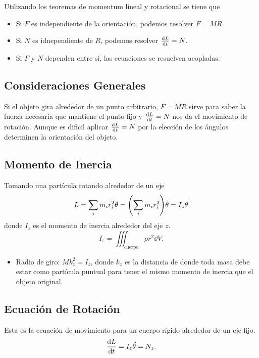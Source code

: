 Utilizando los teoremas de momentum lineal y rotacional se tiene que 
\begin{itemize}
	\item Si $F$ es independiente de la orientación, podemos resolver $F = M\ddot{R}$.
	\item Si $N$ es idnependiente de $R$, podemos resolver $\dv{L}{t} = N$.
	\item Si $F$ y $N$ dependen entre sí, las ecuaciones se resuelven acopladas.
\end{itemize}

\subsection{Consideraciones Generales}
Si el objeto gira alrededor de un punto arbitrario, $F = M\ddot{R}$ sirve para saber la fuerza necesaria que mantiene el punto fijo y $\dv{L}{t} = N$ nos da el movimiento de rotación. Aunque es dificil aplicar $\dv{L}{t} = N$ por la elección de los ángulos determinen la orientación del objeto.

\subsection{Momento de Inercia}
Tomando una partícula rotando alrededor de un eje
	\begin{equation}
		L = \sum _i m_i r_i ^2 \dot{\theta} = \qty(\sum _i m_i r_i ^2) \dot{\theta} = I_z \dot{\theta}
	\end{equation}
donde $I_z$ es el momento de inercia alrededor del eje $z$.
\begin{equation}
	I_z = \iiint _{\text{cuerpo}} \rho r^2 \dd{V}.
\end{equation}
\begin{itemize}
	\item Radio de giro: $Mk_z ^2 = I_z$, donde $k_z$ es la distancia de donde toda masa debe estar como partícula puntual para tener el mismo momento de inercia que el objeto original.
\end{itemize}

\subsection{Ecuación de Rotación}
Esta es la ecuación de movimiento para un cuerpo rígido alrededor de un eje fijo.
\begin{equation}
	\dv{L}{t} = I_z \ddot{\theta} = N_z.
\end{equation}


